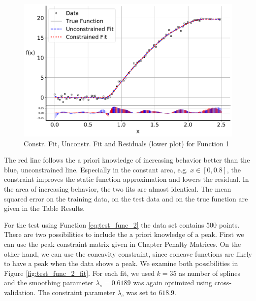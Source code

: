 \documentclass[10pt,a4paper]{article}
\begin{document}
\begin{figure}[H]
	\centering
	\includegraphics[width=\columnwidth]{../thesisplots/exp_inc1_fit.pdf}
	\caption{Constr. Fit, Unconstr. Fit and Residuals (lower plot) for Function 1}
	\label{fig:test_func_1_fit}
\end{figure}

The red line follows the a priori knowledge of increasing behavior better than the blue, unconstrained line. Especially in the constant area, e.g. $x \in  [0, 0.8]$, the constraint improves the static function approximation and lowers the residual. In the area of increasing behavior, the two fits are almost identical. The mean squared error on the training data, on the test data and on the true function are given in the Table Results.

For the test using Function \ref{eq:test_func_2} the data set contains 500 points. There are two possibilities to include the a priori knowledge of a peak. First we can use the peak constraint matrix given in Chapter Penalty Matrices. On the other hand, we can use the concavity constraint, since concave functions are likely to have a peak when the data shows a peak. We examine both possibilities in Figure \ref{fig:test_func_2_fit}. For each fit, we used $k=35$ as number of splines and the smoothing parameter $\lambda_s=0.6189$ was again optimized using cross-validation. The constraint parameter $\lambda_c$ was set to $618.9$.
\end{document}
